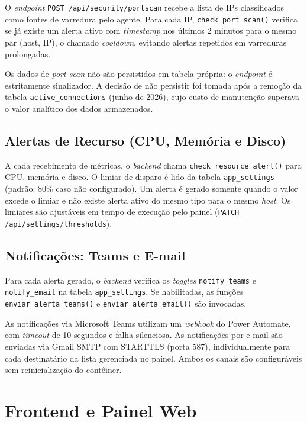 \documentclass[
    12pt
    ,oneside
    ,a4paper
    ,chapter=TITLE
    ,section=TITLE
    ,sumario=abnt-6027-2012]{abntex2}
\begin{document}
O \textit{endpoint} \texttt{POST /api/security/portscan} recebe a lista de IPs
classificados como fontes de varredura pelo agente. Para cada IP,
\texttt{check\_port\_scan()} verifica se já existe um alerta ativo com
\textit{timestamp} nos últimos 2 minutos para o mesmo par (host, IP), o chamado \textit{cooldown}, evitando alertas repetidos em varreduras prolongadas.

Os dados de \textit{port scan} não são persistidos em tabela própria: o
\textit{endpoint} é estritamente sinalizador. A decisão de não persistir foi tomada
após a remoção da tabela \texttt{active\_connections} (junho de 2026), cujo custo de
manutenção superava o valor analítico dos dados armazenados.

\subsection{Alertas de Recurso (CPU, Memória e Disco)}
\label{subsec:resource-alerts}

A cada recebimento de métricas, o \textit{backend} chama
\texttt{check\_resource\_alert()} para CPU, memória e disco. O limiar de disparo é
lido da tabela \texttt{app\_settings} (padrão: 80\% caso não configurado). Um alerta
é gerado somente quando o valor excede o limiar e não existe alerta ativo do mesmo
tipo para o mesmo \textit{host}. Os limiares são ajustáveis em tempo de execução
pelo painel (\texttt{PATCH /api/settings/thresholds}).

\subsection{Notificações: Teams e E-mail}
\label{subsec:notificacoes}

Para cada alerta gerado, o \textit{backend} verifica os \textit{toggles}
\texttt{notify\_teams} e \texttt{notify\_email} na tabela \texttt{app\_settings}.
Se habilitadas, as funções \texttt{enviar\_alerta\_teams()} e
\texttt{enviar\_alerta\_email()} são invocadas.

As notificações via Microsoft Teams utilizam um \textit{webhook} do Power Automate,
com \textit{timeout} de 10 segundos e falha silenciosa. As notificações por e-mail
são enviadas via Gmail SMTP com STARTTLS (porta 587), individualmente para cada
destinatário da lista gerenciada no painel. Ambos os canais são configuráveis sem
reinicialização do contêiner.

\section{Frontend e Painel Web}
\label{sec:frontend}
\end{document}
